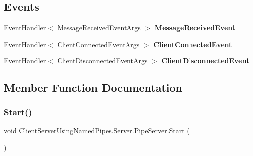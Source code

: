 \subsection*{Events}
\begin{DoxyCompactItemize}
\item 
\mbox{\label{class_client_server_using_named_pipes_1_1_server_1_1_pipe_server_a7fcb193714e540b9a5c6d13b9b918c74}} 
Event\+Handler$<$ \hyperlink{class_client_server_using_named_pipes_1_1_interfaces_1_1_message_received_event_args}{Message\+Received\+Event\+Args} $>$ {\bfseries Message\+Received\+Event}
\item 
\mbox{\label{class_client_server_using_named_pipes_1_1_server_1_1_pipe_server_a464991f389e0687209b3e2e1e1274cb6}} 
Event\+Handler$<$ \hyperlink{class_client_server_using_named_pipes_1_1_interfaces_1_1_client_connected_event_args}{Client\+Connected\+Event\+Args} $>$ {\bfseries Client\+Connected\+Event}
\item 
\mbox{\label{class_client_server_using_named_pipes_1_1_server_1_1_pipe_server_a6f3d1cbcb8140447abc987d141113e7d}} 
Event\+Handler$<$ \hyperlink{class_client_server_using_named_pipes_1_1_interfaces_1_1_client_disconnected_event_args}{Client\+Disconnected\+Event\+Args} $>$ {\bfseries Client\+Disconnected\+Event}
\end{DoxyCompactItemize}


\subsection{Member Function Documentation}
\mbox{\label{class_client_server_using_named_pipes_1_1_server_1_1_pipe_server_a91d854612c235fa7da870e6a861f91c5}} 
\subsubsection{\texorpdfstring{Start()}{Start()}}
{\footnotesize\ttfamily void Client\+Server\+Using\+Named\+Pipes.\+Server.\+Pipe\+Server.\+Start (\begin{DoxyParamCaption}{ }\end{DoxyParamCaption})\hspace{0.3cm}{\ttfamily [inline]}}



